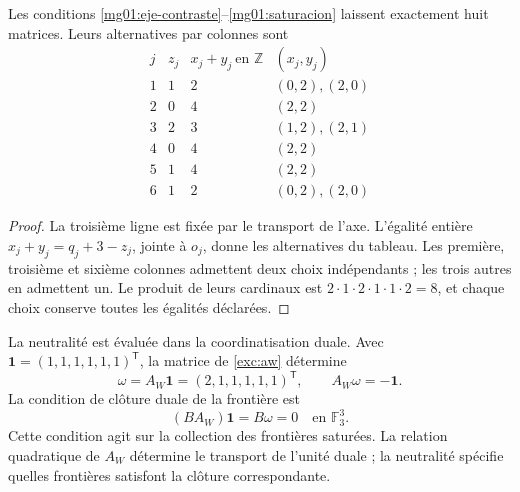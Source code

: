 \begin{proposition}
\label{mg01:ocho}
Les conditions \eqref{mg01:eje-contraste}--\eqref{mg01:saturacion}
laissent exactement huit matrices. Leurs alternatives par colonnes sont
\begin{equation}
\begin{array}{c|c|c|c}
 j&z_j&x_j+y_j\ \text{en }\mathbb Z&(x_j,y_j)\\\hline
 1&1&2&(0,2),(2,0)\\
 2&0&4&(2,2)\\
 3&2&3&(1,2),(2,1)\\
 4&0&4&(2,2)\\
 5&1&4&(2,2)\\
 6&1&2&(0,2),(2,0)
\end{array}
\label{mg01:tabla-columnas}
\end{equation}
\end{proposition}
\begin{proof}
La troisième ligne est fixée par le transport de l'axe. L'égalité
entière \(x_j+y_j=q_j+3-z_j\), jointe à \(o_j\), donne les alternatives
du tableau. Les première, troisième et sixième colonnes admettent deux choix
indépendants ; les trois autres en admettent un. Le produit de leurs cardinaux
est \(2\cdot1\cdot2\cdot1\cdot1\cdot2=8\), et chaque choix conserve
toutes les égalités déclarées.
\end{proof}

La neutralité est évaluée dans la coordinatisation duale. Avec
\(\mathbf1=(1,1,1,1,1,1)^{\mathsf T}\), la matrice de
\eqref{exc:aw} détermine
\begin{equation}
 \omega=A_W\mathbf1=(2,1,1,1,1,1)^{\mathsf T},
 \qquad A_W\omega=-\mathbf1.
 \label{mg01:unidad-dual}
\end{equation}
La condition de clôture duale de la frontière est
\begin{equation}
 (BA_W)\mathbf1=B\omega=0\quad\text{en }\mathbb F_3^3.
 \label{mg01:neutralidad}
\end{equation}
Cette condition agit sur la collection des frontières saturées. La relation
quadratique de \(A_W\) détermine le transport de l'unité duale ; la
neutralité spécifie quelles frontières satisfont la clôture correspondante.


